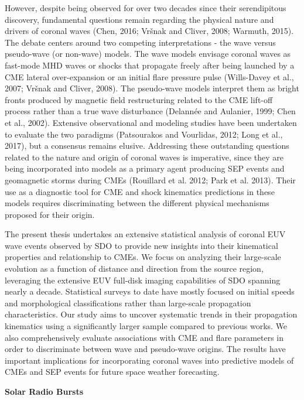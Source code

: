 \documentclass{article}
\begin{document}
However, despite being observed for over two decades since their serendipitous discovery, fundamental questions remain regarding the physical nature and drivers of coronal waves (Chen, 2016; Vršnak and Cliver, 2008; Warmuth, 2015). The debate centers around two competing interpretations - the wave versus pseudo-wave (or non-wave) models. The wave models envisage coronal waves as fast-mode MHD waves or shocks that propagate freely after being launched by a CME lateral over-expansion or an initial flare pressure pulse (Wills-Davey et al., 2007; Vršnak and Cliver, 2008). The pseudo-wave models interpret them as bright fronts produced by magnetic field restructuring related to the CME lift-off process rather than a true wave disturbance (Delannée and Aulanier, 1999; Chen et al., 2002). Extensive observational and modeling studies have been undertaken to evaluate the two paradigms (Patsourakos and Vourlidas, 2012; Long et al., 2017), but a consensus remains elusive. Addressing these outstanding questions related to the nature and origin of coronal waves is imperative, since they are being incorporated into models as a primary agent producing SEP events and geomagnetic storms during CMEs (Rouillard et al. 2012; Park et al. 2013). Their use as a diagnostic tool for CME and shock kinematics predictions in these models requires discriminating between the different physical mechanisms proposed for their origin.

The present thesis undertakes an extensive statistical analysis of coronal EUV wave events observed by SDO to provide new insights into their kinematical properties and relationship to CMEs. We focus on analyzing their large-scale evolution as a function of distance and direction from the source region, leveraging the extensive EUV full-disk imaging capabilities of SDO spanning nearly a decade. Statistical surveys to date have mostly focused on initial speeds and morphological classifications rather than large-scale propagation characteristics. Our study aims to uncover systematic trends in their propagation kinematics using a significantly larger sample compared to previous works. We also comprehensively evaluate associations with CME and flare parameters in order to discriminate between wave and pseudo-wave origins. The results have important implications for incorporating coronal waves into predictive models of CMEs and SEP events for future space weather forecasting.


\textbf{Solar Radio Bursts}
\end{document}
